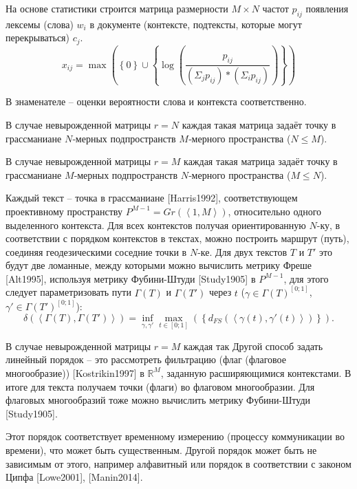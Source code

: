 На основе статистики строится матрица размерности $M\times{N}$ частот $p_{ij}$ появления лексемы (слова) $w_{i}$ в документе (контексте, подтексты, которые могут перекрываться) $c_{j}$.
$$
x_{ij}=\max{\left( \left\lbrace 0\right\rbrace \cup \left\lbrace \log{\left(\frac{p_{ij}}{\left( \Sigma_{j} p_{ij}\right) *\left( \Sigma_{i} p_{ij}\right) } \right) }\right\rbrace \right) }
$$

В знаменателе -- оценки вероятности слова и контекста соответственно.

В случае невырожденной матрицы $r=N$ каждая такая матрица задаёт точку в грассманиане $N$‑мерных подпространств $M$‑мерного пространства ($N\leq{M}$).

В случае невырожденной матрицы $r=M$ каждая такая матрица задаёт точку в грассманиане $M$‑мерных подпространств $N$‑мерного пространства ($M\leq{N}$).

Каждый текст -- точка в грассманиане [Harris1992], соответствующем проективному пространству $P^{M-1}=Gr\left( \left\langle1,M \right\rangle \right)$, относительно одного выделенного контекста. Для всех контекстов получая ориентированную $N$-ку, в соответствии с порядком контекстов в текстах, можно построить маршрут (путь), соединяя геодезическими соседние точки в $N$-ке. Для двух текстов $T$ и $T'$ это будут две ломанные, между которыми можно вычислить метрику Фреше [Alt1995], используя метрику Фубини-Штуди [Study1905] в $P^{M-1}$, для этого следует параметризовать пути $\Gamma\left( T \right)$ и $\Gamma\left( T' \right)$ через $t$ ($\gamma\in\Gamma\left( T \right)^{\left[ 0;1\right] }$,$\gamma' \in\Gamma\left( T'\right)^{\left[ 0;1\right] }$): 
$$
\delta\left( \left\langle \Gamma\left( T \right),\Gamma\left( T'\right)\right\rangle \right) =\inf_{\gamma,\gamma'}\max_{t\in\left[ 0;1\right] }\left(  \left\lbrace d_{FS}\left( \left\langle \gamma\left( t\right) ,\gamma'\left( t\right) \right\rangle \right) \right\rbrace \right).
$$

В случае невырожденной матрицы $r=M$ каждая так
Другой способ задать линейный порядок -- это рассмотреть фильтрацию (флаг (флаговое многообразие)) [Kostrikin1997] в $\mathbb{R}^{M}$, заданную расширяющимися контекстами. В итоге для текста получаем точки (флаги) во флаговом многообразии. Для флаговых многообразий тоже можно вычислить метрику Фубини-Штуди [Study1905].

Этот порядок соответствует временному измерению (процессу коммуникации во времени), что может быть существенным. Другой порядок может быть не зависимым от этого, например алфавитный или порядок в соответствии с законом Ципфа [Lowe2001], [Manin2014]. 

